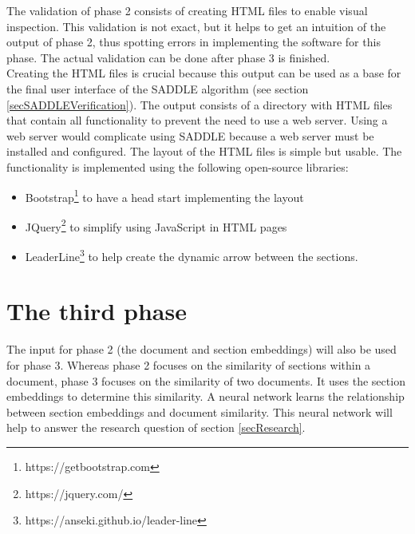 The validation of phase 2 consists of creating HTML files to enable visual inspection. This validation is not exact, but it helps to get an intuition of the output of phase 2, thus spotting errors in implementing the software for this phase. The actual validation can be done after phase 3 is finished.\\

Creating the HTML files is crucial because this output can be used as a base for the final user interface of the SADDLE algorithm (see section \ref{secSADDLEVerification}). The output consists of a directory with HTML files that contain all functionality to prevent the need to use a web server. Using a web server would complicate using SADDLE because a web server must be installed and configured. The layout of the HTML files is simple but usable. The functionality is implemented using the following open-source libraries: 
\begin{itemize}
  \item Bootstrap\footnote{https://getbootstrap.com} to have a head start implementing the layout
  \item JQuery\footnote{https://jquery.com/} to simplify using JavaScript in HTML pages
  \item LeaderLine\footnote{https://anseki.github.io/leader-line} to help create the dynamic arrow between the sections.
\end{itemize}

\section{The third phase}
\label{phase3}

The input for phase 2 (the document and section embeddings) will also be used for phase 3. Whereas phase 2 focuses on the similarity of sections within a document, phase 3 focuses on the similarity of two documents. It uses the section embeddings to determine this similarity. A neural network learns the relationship between section embeddings and document similarity. This neural network will help to answer the research question of section \ref{secResearch}.\\

